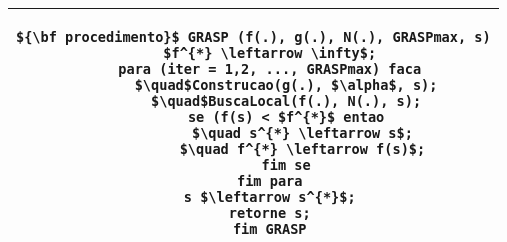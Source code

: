 \begin{tabular}{c} \hline
        \begin{lstlisting}[mathescape] 
	${\bf procedimento}$ GRASP (f(.), g(.), N(.), GRASPmax, s)
	$f^{*} \leftarrow \infty$;
	para (iter = 1,2, ..., GRASPmax) faca
		$\quad$Construcao(g(.), $\alpha$, s);
		$\quad$BuscaLocal(f(.), N(.), s);
		se (f(s) < $f^{*}$ entao
			$\quad s^{*} \leftarrow s$;
			$\quad f^{*} \leftarrow f(s)$;
		fim se
	fim para
	s $\leftarrow s^{*}$;
	retorne s;
	fim GRASP
	\end{lstlisting}\\
\hline
 \end{tabular}
